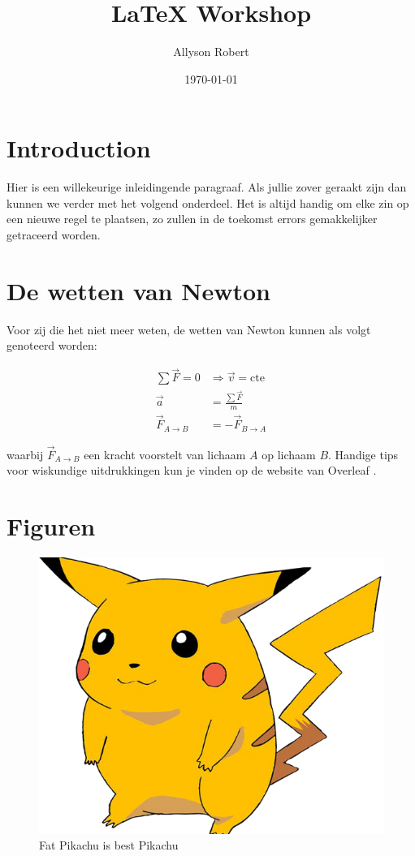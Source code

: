 \documentclass{article}
\title{LaTeX Workshop}
\author{Allyson Robert}
\date{\today}
\begin{document}
\maketitle
\tableofcontents

\section{Introduction}
\label{sec:intro}
Hier is een willekeurige inleidingende paragraaf. 
Als jullie zover geraakt zijn dan kunnen we verder met het volgend onderdeel.
Het is altijd handig om elke zin op een nieuwe regel te plaatsen, zo zullen in de toekomst errors gemakkelijker getraceerd worden.

\section{De wetten van Newton}
Voor zij die het niet meer weten, de wetten van Newton kunnen als volgt genoteerd worden:

\begin{align}
    \sum \vec{F} = 0 &\Rightarrow \vec{v} = \text{cte}\\
    \vec{a} &= \frac{\sum \vec{F}}{m} \\
    \vec{F}_{A\to B} &= -\vec{F}_{B \to A}
\end{align}

waarbij $\vec{F}_{A \to B}$ een kracht voorstelt van lichaam $A$ op lichaam $B$.
Handige tips voor wiskundige uitdrukkingen kun je vinden op de website van Overleaf \cite{OverleafMath}.

\section{Figuren}
    \begin{figure}[H]
    \centering
    \includegraphics[width=\textwidth]{img/pikachu_transparent.png}
    \caption{Fat Pikachu is best Pikachu}
    \label{fig:pikachu}
\end{figure}
\end{document}
